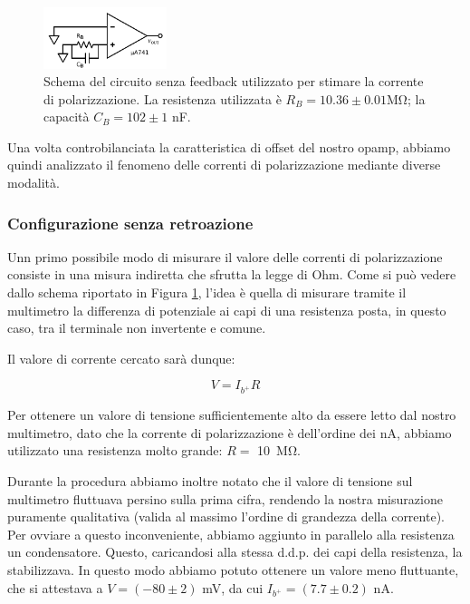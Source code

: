 \begin{figure}
  \begin{center}
    \includegraphics[width=0.320\textwidth]{../E02/latex/direct_measure.pdf}
  \end{center}
  \caption{Schema del circuito senza feedback utilizzato per stimare la corrente di polarizzazione. La resistenza utilizzata è $R_B=10.36\pm0.01$\si{\mega\ohm}; la capacità $C_B=102 \pm 1$ \si{\nano\farad}.}
  \label{cir2:correnti_senzaretroazione}
\end{figure}

Una volta controbilanciata la caratteristica di offset del nostro opamp, abbiamo quindi analizzato il fenomeno delle correnti di polarizzazione mediante diverse modalità.

\subsubsection{Configurazione senza retroazione}

Unn primo possibile modo di misurare il valore delle correnti di polarizzazione consiste in una misura indiretta che sfrutta la legge di Ohm.
Come si può vedere dallo schema riportato in Figura \ref{cir2:correnti_senzaretroazione}, l'idea è quella di misurare tramite il multimetro la differenza di potenziale ai capi di una resistenza posta, in questo caso, tra il terminale non invertente e comune.

Il valore di corrente cercato sarà dunque:

$$V=I_{b^+} R$$

Per ottenere un valore di tensione sufficientemente alto da essere letto dal nostro multimetro, dato che la corrente di polarizzazione è dell'ordine dei \si{\nano\ampere}, abbiamo utilizzato una resistenza molto grande: $R =$ \SI{10}{\mega\ohm}.

Durante la procedura abbiamo inoltre notato che il valore di tensione sul multimetro fluttuava persino sulla prima cifra, rendendo la nostra misurazione puramente qualitativa (valida al massimo l'ordine di grandezza della corrente).
Per ovviare a questo inconveniente, abbiamo aggiunto in parallelo alla resistenza un condensatore. Questo, caricandosi alla stessa d.d.p. dei capi della resistenza, la stabilizzava.
In questo modo abbiamo potuto ottenere un valore meno fluttuante, che si attestava a $V=(-80 \pm 2)$ \si{\milli\volt}, da cui $I_{b^+}=(7.7 \pm 0.2)$ \si{\nano\ampere}.

